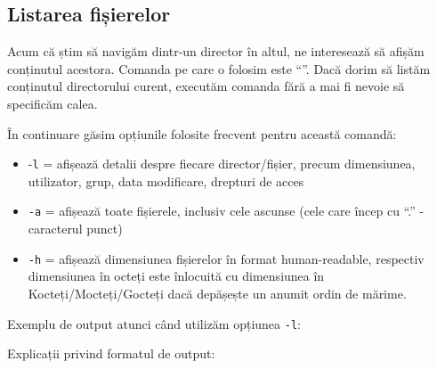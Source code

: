 \subsection{Listarea fișierelor}

Acum că știm să navigăm dintr-un director în altul, ne interesează să afișăm
conținutul acestora.  Comanda pe care o folosim este “”. Dacă dorim să listăm conținutul directorului curent, executăm comanda
 fără a mai fi nevoie să specificăm calea.

În continuare găsim opțiunile folosite frecvent pentru această comandă:


\begin{itemize}
	\item -\texttt{l}  = afișează detalii despre fiecare director/fișier,
		precum dimensiunea, utilizator, grup, data modificare, drepturi
		de acces
	\item \texttt{-a} = afișează toate fișierele, inclusiv cele ascunse (cele
		care încep cu “.” - caracterul punct)
	\item \texttt{-h} = afișează dimensiunea fișierelor în format
		human-readable, respectiv dimensiunea în octeți este înlocuită
		cu dimensiunea în Kocteți/Mocteți/Gocteți dacă depășește un
		anumit ordin de mărime.
\end{itemize}


Exemplu de output atunci când utilizăm opțiunea \texttt{-l}:


Explicații privind formatul de output:

